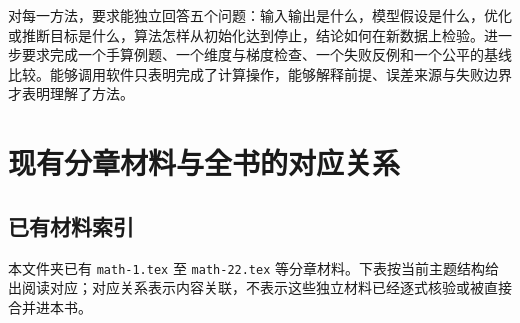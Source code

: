 \documentclass[UTF8,12pt,a4paper,fontset=fandol]{ctexbook}
\begin{document}
对每一方法，要求能独立回答五个问题：输入输出是什么，模型假设是什么，优化或推断目标是什么，算法怎样从初始化达到停止，结论如何在新数据上检验。进一步要求完成一个手算例题、一个维度与梯度检查、一个失败反例和一个公平的基线比较。能够调用软件只表明完成了计算操作，能够解释前提、误差来源与失败边界才表明理解了方法。

\chapter{现有分章材料与全书的对应关系}
\label{app:ml-materials}

\section{已有材料索引}

本文件夹已有 \texttt{math-1.tex} 至 \texttt{math-22.tex} 等分章材料。下表按当前主题结构给出阅读对应；对应关系表示内容关联，不表示这些独立材料已经逐式核验或被直接合并进本书。
\end{document}
